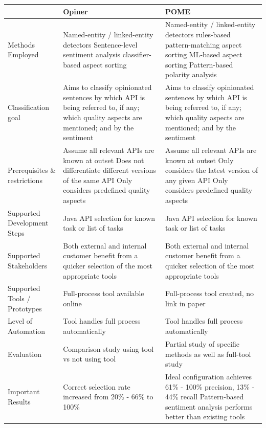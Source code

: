 \documentclass[a4paper,10pt, bibliography=totocnumbered]{scrreprt}
\begin{document}
\RaggedRight
    \begin{tabular}{ m{3cm} | m{4cm} | m{4cm} }
          & Opiner & POME  \\
         \hline
         Methods Employed & Named-entity / linked-entity detectors \linebreak Sentence-level sentiment analysis \linebreak classifier-based aspect sorting & Named-entity / linked-entity detectors \linebreak rules-based pattern-matching aspect sorting \linebreak ML-based aspect sorting \linebreak Pattern-based polarity analysis\\
         \hline
         Classification goal & Aims to classify opinionated sentences by which API is being referred to, if any; which quality aspects are mentioned; and by the sentiment & Aims to classify opinionated sentences by which API is being referred to, if any; which quality aspects are mentioned; and by the sentiment \\
         \hline
         Prerequisites \& restrictions & Assume all relevant APIs are known at outset \linebreak Does not differentiate different versions of the same API \linebreak Only considers predefined quality aspects & Assume all relevant APIs are known at outset \linebreak Only considers the latest version of any given API \linebreak Only considers predefined quality aspects\\
         \hline
         Supported Development Steps & Java API selection for known task or list of tasks & Java API selection for known task or list of tasks\\ 
         \hline
         Supported Stakeholders & Both external and internal customer benefit from a quicker selection of the most appropriate tools & Both external and internal customer benefit from a quicker selection of the most appropriate tools \\
         \hline
         Supported Tools / Prototypes & Full-process tool available online & Full-process tool created, no link in paper \\
         \hline
         Level of Automation & Tool handles full process automatically & Tool handles full process automatically \\
         \hline
         Evaluation & Comparison study using tool vs not using tool & Partial study of specific methods as well as full-tool study \\
         \hline
         Important Results & Correct selection rate increased from 20\% - 66\% to 100\% & Ideal configuration achieves 61\% - 100\% precision, 13\% - 44\% recall \linebreak Pattern-based sentiment analysis performs better than existing tools
    \end{tabular}
\end{document}
